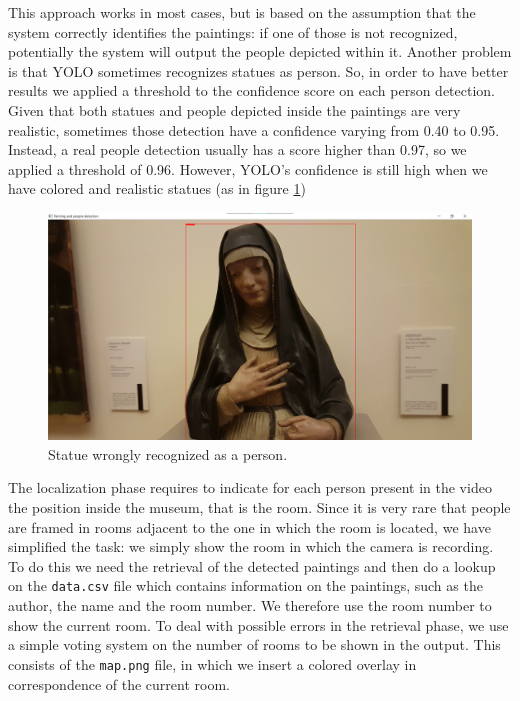 \documentclass[10pt,twocolumn,letterpaper]{article}
\begin{document}
This approach works in most cases, but is based on the assumption that the system correctly identifies the paintings: if one of those is not recognized, potentially the system will output the people depicted within it. Another problem is that YOLO sometimes recognizes statues as person. So, in order to have better results we applied a threshold to the confidence score on each person detection. Given that both statues and people depicted inside the paintings are very realistic, sometimes those detection have a confidence varying from 0.40 to 0.95. Instead, a real people detection usually has a score higher than 0.97, so we applied a threshold of 0.96. However, YOLO's confidence is still high when we have colored and realistic statues (as in figure \ref{fig:PeopleDetectionError})

\begin{figure}[t]
\begin{center}
\includegraphics[width=\linewidth]{images/madonna.png}
\end{center}
\caption{Statue wrongly recognized as a person.}
\label{fig:PeopleDetectionError}
\end{figure}

The localization phase requires to indicate for each person present in the video the position inside the museum, that is the room. Since it is very rare that people are framed in rooms adjacent to the one in which the room is located, we have simplified the task: we simply show the room in which the camera is recording. To do this we need the retrieval of the detected paintings and then do a lookup on the \texttt{data.csv} file which contains information on the paintings, such as the author, the name and the room number. We therefore use the room number to show the current room. To deal with possible errors in the retrieval phase, we use a simple voting system on the number of rooms to be shown in the output. This consists of the \texttt{map.png} file, in which we insert a colored overlay in correspondence of the current room.
\end{document}
